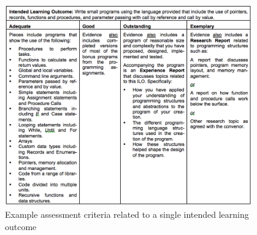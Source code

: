 \begin{figure}[p]
	\centering
	\includegraphics[width=0.95\textwidth]{AssessmentCriteriaDetail}
	\caption{Example assessment criteria related to a single intended learning outcome}
	\label{fig:i6_assessment_criteria_detail}
\end{figure}

